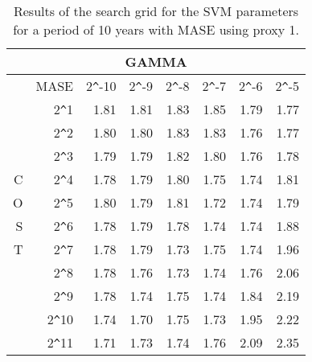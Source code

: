 \begin{table}[h!]
\centering
\begin{adjustbox}{width=0.9\textwidth}
\begin{tabular}{|r|r|rrrrrr|}
\hline
\multicolumn{8}{|c|}{GAMMA} \tabularnewline
\hline
 &MASE& 2\verb|^|-10 & 2\verb|^|-9 & 2\verb|^|-8 & 2\verb|^|-7 & 2\verb|^|-6 & 2\verb|^|-5 \\ 
  \hline
  &2\verb|^|1 & 1.81 & 1.81 & 1.83 & 1.85 & 1.79 & 1.77 \\ 
  &2\verb|^|2 & 1.80 & 1.80 & 1.83 & 1.83 & 1.76 & 1.77 \\ 
  &2\verb|^|3 & 1.79 & 1.79 & 1.82 & 1.80 & 1.76 & 1.78 \\ 
  C&2\verb|^|4 & 1.78 & 1.79 & 1.80 & 1.75 & 1.74 & 1.81 \\ 
  O&2\verb|^|5 & 1.80 & 1.79 & 1.81 & 1.72 & 1.74 & 1.79 \\ 
  S&2\verb|^|6 & 1.78 & 1.79 & 1.78 & 1.74 & 1.74 & 1.88 \\ 
  T&2\verb|^|7 & 1.78 & 1.79 & 1.73 & 1.75 & 1.74 & 1.96 \\ 
  &2\verb|^|8 & 1.78 & 1.76 & 1.73 & 1.74 & 1.76 & 2.06 \\ 
  &2\verb|^|9 & 1.78 & 1.74 & 1.75 & 1.74 & 1.84 & 2.19 \\ 
  &2\verb|^|10 & 1.74 & 1.70 & 1.75 & 1.73 & 1.95 & 2.22 \\ 
  &2\verb|^|11 & 1.71 & 1.73 & 1.74 & 1.76 & 2.09 & 2.35 \\ 
   \hline
\end{tabular}
\end{adjustbox}
\caption{Results of the search grid for the SVM parameters for a period of 10 years with MASE using proxy 1.}
\end{table}